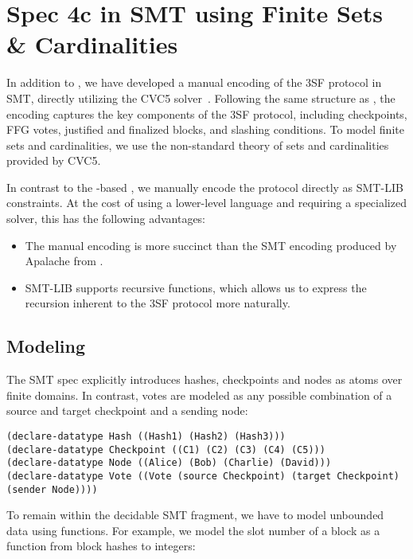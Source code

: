 
\section{Spec 4c in SMT using Finite Sets \& Cardinalities}

In addition to \SpecFour{}, we have developed a manual encoding of the 3SF
protocol in SMT, directly utilizing the CVC5
solver~\cite{DBLP:conf/tacas/BarbosaBBKLMMMN22}. Following the same
structure as \SpecFour{}, the encoding captures the key components of the 3SF
protocol, including checkpoints, FFG votes, justified and finalized blocks,
and slashing conditions.
To model finite sets and cardinalities, we use the non-standard theory of sets
and cardinalities~\cite{DBLP:journals/lmcs/BansalBRT18} provided by CVC5.

In contrast to the \tlap{}-based \SpecFour{}, we manually encode the protocol
directly as SMT-LIB constraints. At the cost of using a lower-level language and
requiring a specialized solver, this has the following advantages:
\begin{itemize}
  \item The manual encoding is more succinct than the SMT encoding produced by
    Apalache from \tlap{}.
  \item SMT-LIB supports recursive functions, which allows us to express the
    recursion inherent to the 3SF protocol more naturally.
\end{itemize}

\subsection{Modeling}
The SMT spec explicitly introduces hashes, checkpoints and nodes as atoms over
finite domains. In contrast, votes are modeled as any possible combination
of a source and target checkpoint and a sending node:

\begin{lstlisting}[language=smt]
(declare-datatype Hash ((Hash1) (Hash2) (Hash3)))
(declare-datatype Checkpoint ((C1) (C2) (C3) (C4) (C5)))
(declare-datatype Node ((Alice) (Bob) (Charlie) (David)))
(declare-datatype Vote ((Vote (source Checkpoint) (target Checkpoint) (sender Node))))
\end{lstlisting}

To remain within the decidable SMT fragment, we have to model unbounded data
using functions. For example, we model the slot number of a block as a function
from block hashes to integers:

